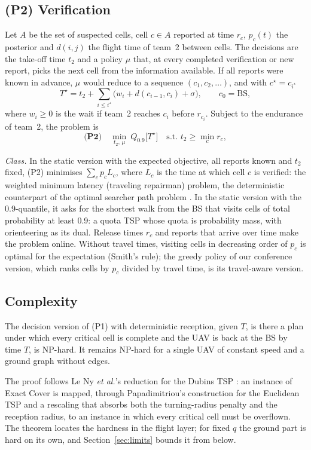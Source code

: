 \subsection{(P2) Verification}
Let $A$ be the set of suspected cells, cell $c\in A$ reported at time $r_c$, $p_c(t)$ the posterior and $d(i,j)$ the
flight time of team~2 between cells. The decisions are the take-off time $t_2$ and a policy $\mu$ that, at every
completed verification or new report, picks the next cell from the information available. If all reports were known in
advance, $\mu$ would reduce to a sequence $(c_1,c_2,\dots)$, and with $c^\star=c_{i^\star}$
\begin{equation}
T^\star=t_2+\sum_{i\le i^\star}\bigl(w_i+d(c_{i-1},c_i)+\sigma\bigr),\qquad c_0=\mathrm{BS},\label{eq:tstar}
\end{equation}
where $w_i\ge0$ is the wait if team~2 reaches $c_i$ before $r_{c_i}$. Subject to the endurance of team~2, the problem
is
\begin{equation}
\textbf{(P2)}\quad \min_{t_2,\,\mu}\ Q_{0.9}\bigl[T^\star\bigr]\quad\text{s.t. } t_2\ge\min_{c} r_c,\label{eq:p2}
\end{equation}

\emph{Class.} In the static version with the expected objective, all reports known and $t_2$ fixed, (P2) minimises
$\sum_c p_cL_c$, where $L_c$ is the time at which cell $c$ is verified: the weighted minimum latency (traveling
repairman) problem, the deterministic counterpart of the optimal searcher path problem \cite{trummel1986}. In the
static version with the 0.9-quantile, it asks for the shortest walk from the BS that visits cells of total probability
at least 0.9: a quota TSP whose quota is probability mass, with orienteering as its dual. Release times $r_c$ and
reports that arrive over time make the problem online. Without travel times, visiting cells in decreasing order of $p_c$
is optimal for the expectation (Smith's rule); the greedy policy of our conference version, which ranks cells by $p_c$
divided by travel time, is its travel-aware version.

\subsection{Complexity}
\begin{theorem}\label{thm:nphard}
The decision version of (P1) with deterministic reception, given $T$, is there a plan under which every critical cell
is complete and the UAV is back at the BS by time $T$, is NP-hard. It remains NP-hard for a single UAV of constant
speed and a ground graph without edges.
\end{theorem}
The proof  follows Le Ny \emph{et al.}'s reduction for the Dubins TSP \cite{leny2012}:
an instance of Exact Cover is mapped, through Papadimitriou's construction for the Euclidean TSP
\cite{papadimitriou1977} and a rescaling that absorbs both the turning-radius penalty \cite{savla2008} and the
reception radius, to an instance in which every critical cell must be overflown. The theorem locates the hardness in
the flight layer; for fixed $q$ the ground part is hard on its own, and Section~\ref{sec:limits} bounds it from below.

